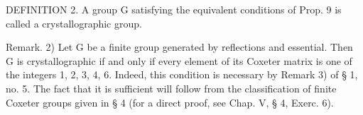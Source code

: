 DEFINITION 2. A group G satisfying the equivalent conditions of Prop. 9 is called a crystallographic group.

Remark. 2) Let G be a finite group generated by reflections and essential. Then G is crystallographic if and only if every element of its Coxeter matrix is one of the integers 1, 2, 3, 4, 6. Indeed, this condition is necessary by Remark 3) of § 1, no. 5. The fact that it is sufficient will follow from the classification of finite Coxeter groups given in § 4 (for a direct proof, see Chap. V, § 4, Exerc. 6).

